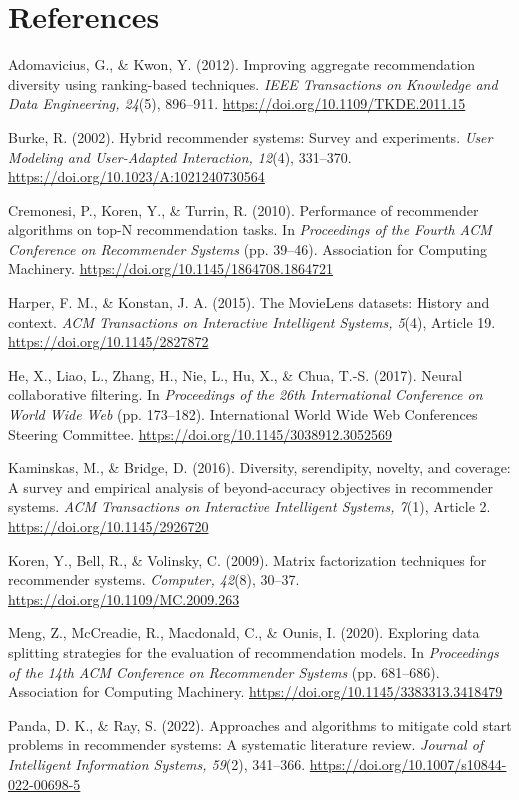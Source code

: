 \documentclass[10pt,twocolumn,letterpaper]{article}
\newenvironment{apareferences}%
  {\section*{References}\small
   \setlength{\parindent}{-0.22in}\setlength{\leftskip}{0.22in}%
   \setlength{\parskip}{5pt}}%
  {\par}
\begin{document}
\begin{apareferences}

Adomavicius, G., \& Kwon, Y. (2012). Improving aggregate recommendation
diversity using ranking-based techniques. \textit{IEEE Transactions on
Knowledge and Data Engineering, 24}(5), 896--911.
\url{https://doi.org/10.1109/TKDE.2011.15}

Burke, R. (2002). Hybrid recommender systems: Survey and experiments.
\textit{User Modeling and User-Adapted Interaction, 12}(4), 331--370.
\url{https://doi.org/10.1023/A:1021240730564}

Cremonesi, P., Koren, Y., \& Turrin, R. (2010). Performance of recommender
algorithms on top-N recommendation tasks. In \textit{Proceedings of the Fourth
ACM Conference on Recommender Systems} (pp. 39--46). Association for Computing
Machinery. \url{https://doi.org/10.1145/1864708.1864721}

Harper, F. M., \& Konstan, J. A. (2015). The MovieLens datasets: History and
context. \textit{ACM Transactions on Interactive Intelligent Systems, 5}(4),
Article 19. \url{https://doi.org/10.1145/2827872}

He, X., Liao, L., Zhang, H., Nie, L., Hu, X., \& Chua, T.-S. (2017). Neural
collaborative filtering. In \textit{Proceedings of the 26th International
Conference on World Wide Web} (pp. 173--182). International World Wide Web
Conferences Steering Committee. \url{https://doi.org/10.1145/3038912.3052569}

Kaminskas, M., \& Bridge, D. (2016). Diversity, serendipity, novelty, and
coverage: A survey and empirical analysis of beyond-accuracy objectives in
recommender systems. \textit{ACM Transactions on Interactive Intelligent
Systems, 7}(1), Article 2. \url{https://doi.org/10.1145/2926720}

Koren, Y., Bell, R., \& Volinsky, C. (2009). Matrix factorization techniques
for recommender systems. \textit{Computer, 42}(8), 30--37.
\url{https://doi.org/10.1109/MC.2009.263}

Meng, Z., McCreadie, R., Macdonald, C., \& Ounis, I. (2020). Exploring data
splitting strategies for the evaluation of recommendation models. In
\textit{Proceedings of the 14th ACM Conference on Recommender Systems}
(pp. 681--686). Association for Computing Machinery.
\url{https://doi.org/10.1145/3383313.3418479}

Panda, D. K., \& Ray, S. (2022). Approaches and algorithms to mitigate cold
start problems in recommender systems: A systematic literature review.
\textit{Journal of Intelligent Information Systems, 59}(2), 341--366.
\url{https://doi.org/10.1007/s10844-022-00698-5}


\end{apareferences}
\end{document}
